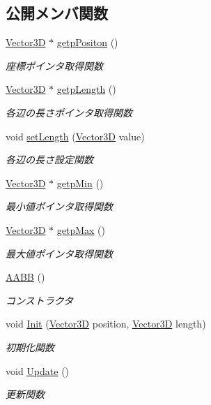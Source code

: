 \subsection*{公開メンバ関数}
\begin{DoxyCompactItemize}
\item 
\mbox{\hyperlink{class_vector3_d}{Vector3D}} $\ast$ \mbox{\hyperlink{class_a_a_b_b_ad89a0086c07d2bf1e0531ae6a0877664}{getp\+Positon}} ()
\begin{DoxyCompactList}\small\item\em 座標ポインタ取得関数 \end{DoxyCompactList}\item 
\mbox{\hyperlink{class_vector3_d}{Vector3D}} $\ast$ \mbox{\hyperlink{class_a_a_b_b_ad86a852594d4a7833b74588937e0c55c}{getp\+Length}} ()
\begin{DoxyCompactList}\small\item\em 各辺の長さポインタ取得関数 \end{DoxyCompactList}\item 
void \mbox{\hyperlink{class_a_a_b_b_a76816b1eb872408d91dfa6880e5af109}{set\+Length}} (\mbox{\hyperlink{class_vector3_d}{Vector3D}} value)
\begin{DoxyCompactList}\small\item\em 各辺の長さ設定関数 \end{DoxyCompactList}\item 
\mbox{\hyperlink{class_vector3_d}{Vector3D}} $\ast$ \mbox{\hyperlink{class_a_a_b_b_a3733a8d866acc126266c892a23abe39d}{getp\+Min}} ()
\begin{DoxyCompactList}\small\item\em 最小値ポインタ取得関数 \end{DoxyCompactList}\item 
\mbox{\hyperlink{class_vector3_d}{Vector3D}} $\ast$ \mbox{\hyperlink{class_a_a_b_b_aa7f199155cc3de141aba0bc25e6d9e68}{getp\+Max}} ()
\begin{DoxyCompactList}\small\item\em 最大値ポインタ取得関数 \end{DoxyCompactList}\item 
\mbox{\hyperlink{class_a_a_b_b_a5f5baf6c533905aa1456b3a3eb57bab2}{A\+A\+BB}} ()
\begin{DoxyCompactList}\small\item\em コンストラクタ \end{DoxyCompactList}\item 
void \mbox{\hyperlink{class_a_a_b_b_a28167704c3b21de2ae9f70ac139781c4}{Init}} (\mbox{\hyperlink{class_vector3_d}{Vector3D}} position, \mbox{\hyperlink{class_vector3_d}{Vector3D}} length)
\begin{DoxyCompactList}\small\item\em 初期化関数 \end{DoxyCompactList}\item 
void \mbox{\hyperlink{class_a_a_b_b_a9698fec7358275832b6b84a146ea4a7c}{Update}} ()
\begin{DoxyCompactList}\small\item\em 更新関数 \end{DoxyCompactList}\end{DoxyCompactItemize}
